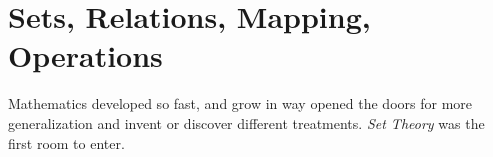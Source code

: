 \section{Sets, Relations, Mapping, Operations}
Mathematics developed so fast, and grow in way opened the doors for more generalization and invent or discover different treatments. {\it Set Theory} was the first room to enter.
